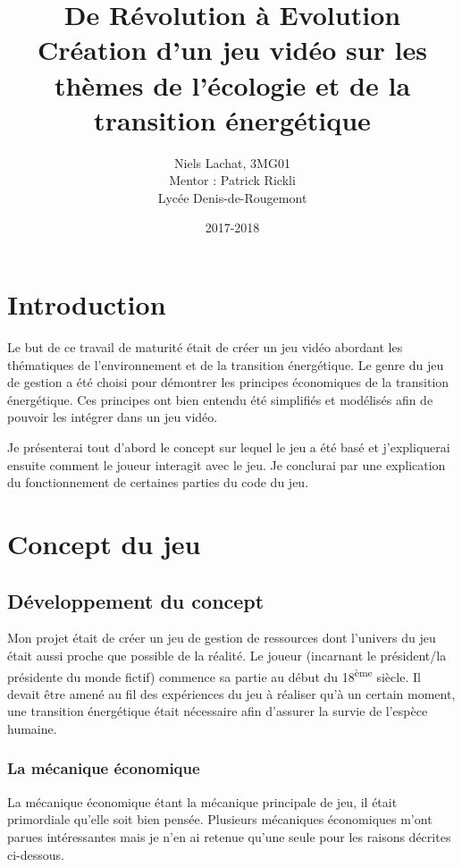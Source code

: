 \documentclass{article}
\title{De Révolution à Evolution \\ Création d'un jeu vidéo sur les thèmes de l'écologie et de la transition énergétique}
\date{2017-2018}
\author{Niels Lachat, 3MG01 \\ Mentor : Patrick Rickli \\ Lycée Denis-de-Rougemont}
\begin{document}
        \maketitle
        \newpage

        \tableofcontents
        \newpage

        \section{Introduction}
        Le but de ce travail de maturité était de créer un jeu vidéo abordant les thématiques de l'environnement et de la transition énergétique. 
        Le genre du jeu de gestion a été choisi pour démontrer les principes économiques de la transition énergétique.
        Ces principes ont bien entendu été simplifiés et modélisés afin de pouvoir les intégrer dans un jeu vidéo.
        
        
        Je présenterai tout d'abord le concept sur lequel le jeu a été basé et j'expliquerai ensuite comment le joueur interagit avec le jeu.
        Je conclurai par une explication du fonctionnement de certaines parties du code du jeu.

        \section{Concept du jeu}
        \subsection{Développement du concept}
        
        Mon projet était de créer un jeu de gestion de ressources dont l'univers du jeu était aussi proche que possible de la réalité. Le joueur (incarnant le président/la présidente du monde fictif) commence sa partie au début du 18\textsuperscript{ème} siècle. Il devait être amené au fil des expériences du jeu à réaliser qu'à un certain moment, une transition énergétique était nécessaire afin d'assurer la survie de l'espèce humaine.
        
        \subsubsection{La mécanique économique}
        La mécanique économique étant la mécanique principale de jeu, il était primordiale qu'elle soit bien pensée.
        Plusieurs mécaniques économiques m'ont parues intéressantes mais je n'en ai retenue qu'une seule pour les raisons décrites ci-dessous.
        
\end{document}
